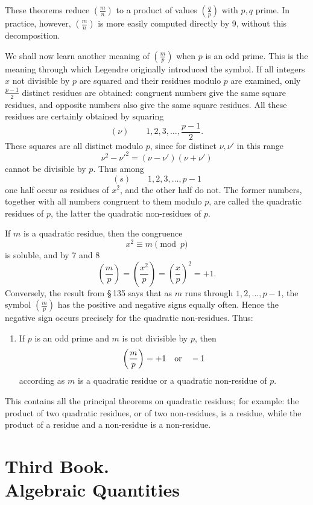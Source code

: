 \documentclass[11pt]{article}
\begin{document}
These theorems reduce $\left(\frac mn\right)$ to a product of values $\left(\frac qp\right)$ with $p,q$ prime. In practice, however, $\left(\frac mn\right)$ is more easily computed directly by 9, without this decomposition.

We shall now learn another meaning of $\left(\frac mp\right)$ when $p$ is an odd prime. This is the meaning through which Legendre originally introduced the symbol. If all integers $x$ not divisible by $p$ are squared and their residues modulo $p$ are examined, only $\frac{p-1}{2}$ distinct residues are obtained: congruent numbers give the same square residues, and opposite numbers also give the same square residues. All these residues are certainly obtained by squaring
\[
(\nu)\qquad 1,2,3,\ldots,\frac{p-1}{2}.
\]
These squares are all distinct modulo $p$, since for distinct $\nu,\nu'$ in this range
\[
        \nu^2-\nu'^2=(\nu-\nu')(\nu+\nu')
\]
cannot be divisible by $p$. Thus among
\[
(s)\qquad 1,2,3,\ldots,p-1
\]
one half occur as residues of $x^2$, and the other half do not. The former numbers, together with all numbers congruent to them modulo $p$, are called the quadratic residues of $p$, the latter the quadratic non-residues of $p$.

If $m$ is a quadratic residue, then the congruence
\[
        x^2\equiv m\pmod p
\]
is soluble, and by 7 and 8
\[
        \left(\frac mp\right)
        =\left(\frac{x^2}p\right)
        =\left(\frac xp\right)^2=+1.
\]
Conversely, the result from §\,135 says that as $m$ runs through $1,2,\ldots,p-1$, the symbol $\left(\frac mp\right)$ has the positive and negative signs equally often. Hence the negative sign occurs precisely for the quadratic non-residues. Thus:

\begin{enumerate}[label=\arabic*.,leftmargin=2em,start=11]
\item If $p$ is an odd prime and $m$ is not divisible by $p$, then
\[
        \left(\frac mp\right)=+1\quad\hbox{or}\quad -1
\]
according as $m$ is a quadratic residue or a quadratic non-residue of $p$.
\end{enumerate}

This contains all the principal theorems on quadratic residues; for example: the product of two quadratic residues, or of two non-residues, is a residue, while the product of a residue and a non-residue is a non-residue.

\section*{Third Book.\\Algebraic Quantities}
\end{document}

